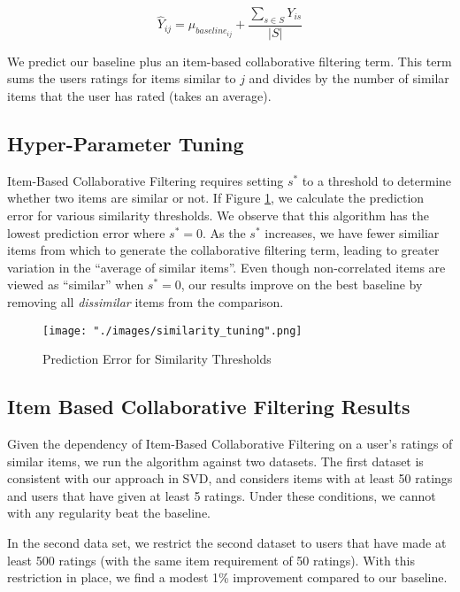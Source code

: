 \documentclass[12pt]{article}
\begin{document}
$$ \hat Y_{ij} = \mu_{baseline_{ij}} + \frac{\sum\limits_{s \in S} Y_{is}}{|S|}$$

We predict our baseline plus an item-based collaborative filtering term.\textsuperscript{\cite{gower}} This term sums the users ratings for items similar to $j$ and divides by the number of similar items that the user has rated (takes an average).

\subsection*{Hyper-Parameter Tuning}
Item-Based Collaborative Filtering requires setting $s^*$ to a threshold to determine whether two items are similar or not. If Figure \ref{fig:similarity_tuning}, we calculate the prediction error for various similarity thresholds. We observe that this algorithm has the lowest prediction error where $s^* = 0$. As the $s^*$ increases, we have fewer similiar items from which to generate the collaborative filtering term, leading to greater variation in the ``average of similar items''. Even though non-correlated items are viewed as ``similar'' when $s^* = 0$, our results improve on the best baseline by removing all \textit{dissimilar} items from the comparison.

\begin{figure}[!ht]
\centering
    \texttt{[image: "./images/similarity\_tuning".png]}
    \caption{Prediction Error for Similarity Thresholds}
    \label{fig:similarity_tuning}
\end{figure}

\subsection*{Item Based Collaborative Filtering Results}

Given the dependency of Item-Based Collaborative Filtering on a user's ratings of similar items, we run the algorithm against two datasets. The first dataset is consistent with our approach in SVD, and considers items with at least 50 ratings and users that have given at least 5 ratings. Under these conditions, we cannot with any regularity beat the baseline.

In the second data set, we restrict the second dataset to users that have made at least 500 ratings (with the same item requirement of 50 ratings). With this restriction in place, we find a modest 1\% improvement compared to our baseline.
\end{document}
